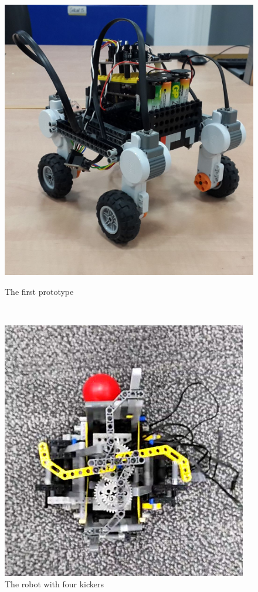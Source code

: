 \documentclass[a4paper,12pt]{article}
\begin{document}
\begin{figure}[h]
	\centering
	\begin{minipage}[b]{.48\textwidth}
        \centering
		\includegraphics[scale=.18]{robot0.jpg}
		\caption{The first prototype}
		\label{fig:robot0}
	\end{minipage}
	~
	\begin{minipage}[b]{.48\textwidth}
        \centering
		\includegraphics[scale=.65]{robot3.jpg}
		\caption{The robot with four kickers}
		\label{fig:robot3}
	\end{minipage}
\end{figure}
\end{document}
